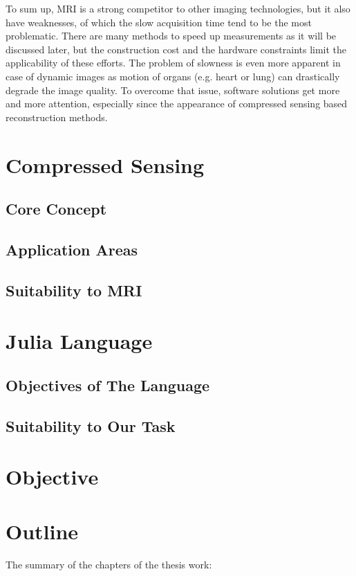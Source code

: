To sum up, MRI is a strong competitor to other imaging technologies, but it also have weaknesses, of which the slow acquisition time tend to be the most problematic. There are many methods to speed up measurements as it will be discussed later, but the construction cost and the hardware constraints limit the applicability of these efforts. The problem of slowness is even more apparent in case of dynamic images as motion of organs (e.g. heart or lung) can drastically degrade the image quality. To overcome that issue, software solutions get more and more attention, especially since the appearance of compressed sensing based reconstruction methods.

\section{Compressed Sensing}
\subsection{Core Concept}
\subsection{Application Areas}
\subsection{Suitability to MRI}

\section{Julia Language}
\subsection{Objectives of The Language}
\subsection{Suitability to Our Task}

\section{Objective}

\section{Outline}
The summary of the chapters of the thesis work:

